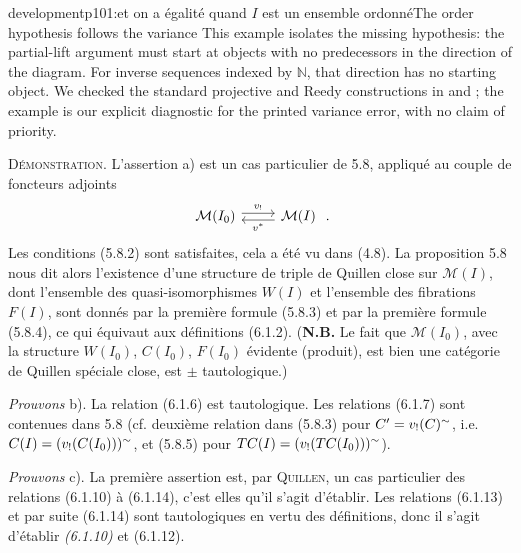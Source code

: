 \begin{dcomment}{development}{p101:et on a égalité quand $I$ est un ensemble ordonné}{The order hypothesis follows the variance}
This example isolates the missing hypothesis: the partial-lift argument must start at objects with no predecessors in the direction of the diagram. For inverse sequences indexed by $\mathbb N$, that direction has no starting object. We checked the standard projective and Reedy constructions in \citet[\S\S12.3 and~14.2]{Riehl2014} and \citet[Observation~4.16]{RiehlVerity2014Reedy}; the example is our explicit diagnostic for the printed variance error, with no claim of priority.
\end{dcomment}


\textsc{Démonstration}. L'assertion a) est un cas particulier de 5.8, appliqué au couple de foncteurs adjoints
\[
\begin{tikzcd}
\mathcal{M}(I_0) \arrow[r, shift left, "v_!"] & \mathcal{M}(I) \arrow[l, shift left, "v^{*}"]
\end{tikzcd}
\;.
\]
Les conditions (5.8.2) sont satisfaites, cela a été vu dans (4.8). La proposition 5.8 nous dit alors l'existence d'une structure de triple de Quillen close sur $\mathcal{M}(I)$, dont l'ensemble des quasi-isomorphismes $W(I)$ et l'ensemble des fibrations $F(I)$, sont donnés par la première formule (5.8.3) et par la première formule (5.8.4), ce qui équivaut aux définitions (6.1.2). (\textbf{N.B.} Le fait que $\mathcal{M}(I_0)$, avec la structure $W(I_0)$, $C(I_0)$, $F(I_0)$ évidente (produit), est
bien une catégorie de Quillen spéciale close, est $\pm$ tautologique.)

\textit{Prouvons} b). La relation (6.1.6) est tautologique. Les relations (6.1.7) sont contenues dans 5.8 (cf. deuxième relation dans (5.8.3) pour $C' = v_!(C)^{\sim}$, i.e. $C(I) = (v_!(C(I_0)))^{\sim}$, et (5.8.5) pour $TC(I) = (v_!(TC(I_0)))^{\sim}$).

\textit{Prouvons} c). La première assertion est, par \textsc{Quillen}, un cas particulier des relations (6.1.10) à (6.1.14), c'est elles qu'il s'agit d'établir. Les relations (6.1.13) et par suite (6.1.14) sont tautologiques en vertu des définitions, donc il s'agit d'établir \textit{(6.1.10)} et (6.1.12).

